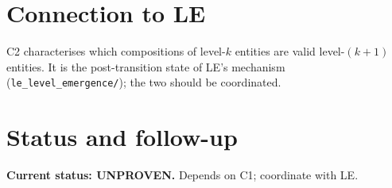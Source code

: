 \documentclass[11pt]{article}
\theoremstyle{plain}
\theoremstyle{definition}
\begin{document}
\section{Connection to LE}

C2 characterises which compositions of level-$k$ entities are valid
level-$(k+1)$ entities. It is the post-transition state of LE's
mechanism (\texttt{le\_level\_emergence/}); the two should be coordinated.

\section{Status and follow-up}

\textbf{Current status: UNPROVEN.} Depends on C1; coordinate with LE.



\end{document}
